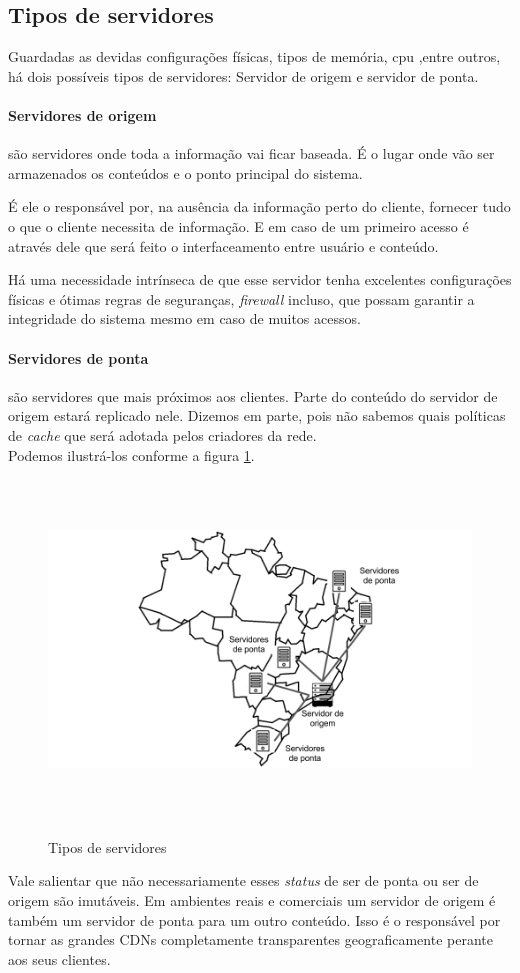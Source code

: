 \subsection{Tipos de servidores}
\label{section:tipos_de_servidores}
Guardadas as devidas configura\c{c}\~oes f\'isicas, tipos de mem\'oria, cpu ,entre outros, h\'a dois poss\'iveis tipos de servidores:  Servidor de origem e servidor de ponta.

\paragraph{Servidores de origem}s\~ao servidores onde toda a informa\c{c}\~ao vai ficar baseada. \'E o lugar onde v\~ao ser armazenados os conte\'udos e o ponto principal do sistema.

\'E ele o respons\'avel por, na aus\^encia da informa\c{c}\~ao perto do cliente, fornecer tudo o que o cliente necessita de informa\c{c}\~ao. E em caso de um primeiro acesso \'e atrav\'es dele que ser\'a feito o interfaceamento entre usu\'ario e conte\'udo.

H\'a uma necessidade intr\'inseca de que esse servidor tenha excelentes configura\c{c}\~oes f\'isicas e \'otimas regras de seguran\c{c}as, \textit{firewall} incluso, que possam garantir a integridade do sistema mesmo em caso de muitos acessos.
\paragraph{Servidores de ponta}s\~ao servidores que mais pr\'oximos aos clientes. Parte do conte\'udo do servidor de origem estar\'a replicado nele. Dizemos em parte, pois n\~ao sabemos quais pol\'iticas de \textit{cache} que ser\'a adotada pelos criadores da rede. 
\\
Podemos ilustr\'a-los conforme a figura \ref{figura:tipos_servidores}.
\begin{figure}[H]
\caption{Tipos de servidores}
\includegraphics[height=9cm]{Figuras/tipos_servidores.png} 
\label{figura:tipos_servidores} 
\end{figure}

Vale salientar que n\~ao necessariamente esses \textit{status} de ser de ponta ou ser de origem s\~ao imut\'aveis. Em ambientes reais e comerciais um servidor de origem \'e tamb\'em um servidor de ponta para um outro conte\'udo. Isso \'e o respons\'avel por tornar as grandes CDNs completamente transparentes geograficamente perante aos seus clientes.